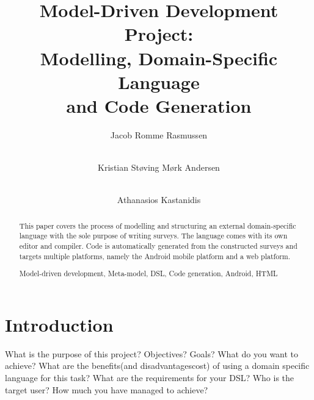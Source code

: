 \documentclass[runningheads]{llncs}
\newcommand{\keywords}[1]{\par\addvspace\baselineskip
\noindent\keywordname\enspace\ignorespaces#1}
\begin{document}
\mainmatter  %

\title{Model-Driven Development Project:\\ Modelling, Domain-Specific Language\\ and Code Generation}


\author{Jacob Romme Rasmussen \and \\ Kristian Støving Mørk Andersen \and \\ Athanasios Kastanidis}
%

\institute{\mailsa\\}

\maketitle


\begin{abstract}
This paper covers the process of modelling and structuring an external domain-specific language with the sole purpose of writing surveys. The language comes with its own editor and compiler. Code is automatically generated from the constructed surveys and targets multiple platforms, namely the Android mobile platform and a web platform. 
\keywords{Model-driven development, Meta-model, DSL, Code generation, Android, HTML}
\end{abstract}

\section{Introduction}

What is the purpose of this project?
Objectives? Goals? What do you want to achieve?
What are the benefits(and disadvantages\/cost) of using a domain
specific language for this task?
What are the requirements for your DSL? Who is the target user?
How much you have managed to achieve?
\end{document}
